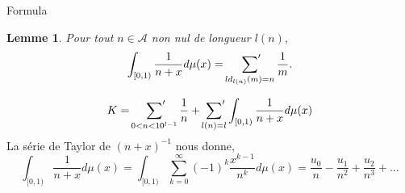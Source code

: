 \documentclass{beamer}
\newcommand{\A}{\mathcal{A}}
\newcommand{\sump}{\sideset{}{'}\sum}
\newtheorem{lem}{Lemme}
\begin{document}
\begin{frame}{Formula}
	\begin{lem}
	Pour tout $n\in\A$ non nul de longueur $l(n)$,
	\[
		\int_{[0, 1)}\frac{1}{n+x} d\mu(x) = \sump_{ld_{l(n)}(m)=n}\frac{1}{m}.
	\]
	\end{lem}
	\[
		K = \sump_{0<n<10^{l-1}} \frac{1}{n} + \sump_{l(n)=l} \int_{[0,1)}
		\frac{1}{n+x}d\mu(x)
	\]
	La série de Taylor de $(n+x)^{-1}$ nous donne,
	\[
		\int_{[0,1)} \frac{1}{n+x} d\mu(x) = \int_{[0, 1)} \sum_{k=0}^{\infty}
		(-1)^{k} \frac{x^{k-1}}{n^{k}} d\mu(x) = \frac{u_{0}}{n} -
		\frac{u_{1}}{n^{2}} + \frac{u_{2}}{n^{3}}+\ldots
	\]
\end{frame}

\end{document}
